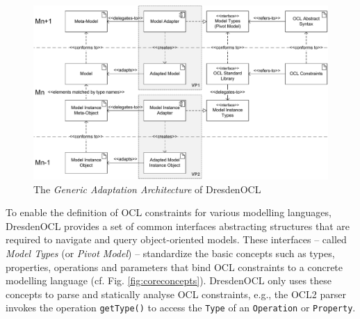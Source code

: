 	\begin{figure}[!t]
			\centering
				\includegraphics[width=1.00\textwidth]{figures/modeladaptation.pdf}
			\caption{The \emph{Generic Adaptation Architecture} of DresdenOCL
			}
			\label{fig:modeladaptation}
		\end{figure}

	To enable the definition of OCL constraints for various modelling languages,
	DresdenOCL provides a set of common interfaces abstracting structures
	that are required to navigate and query object-oriented models.
	These interfaces -- called \emph{Model Types} (or \emph{Pivot Model}) \cite{braeuerOCL07} -- standardize
	the basic	concepts such as types, properties, operations and parameters
	that bind OCL constraints to a concrete modelling language (cf. Fig. \ref{fig:coreconcepts}).
	DresdenOCL only	uses these concepts to parse and statically analyse OCL constraints, 
	e.g., the OCL2 parser	invokes the operation \texttt{getType()} to access the \texttt{Type} of 
	an \texttt{Operation} or \texttt{Property}.
	
